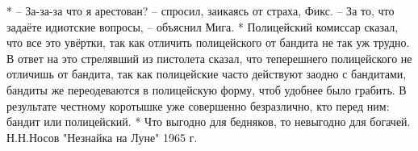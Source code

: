 *
– За-за-за что я арестован? – спросил, заикаясь от страха, Фикс. – За то, что задаёте идиотские вопросы, – объяснил Мига. 
*
Полицейский комиссар сказал, что все это увёртки, так как отличить полицейского от бандита не так уж трудно. В ответ на это стрелявший из пистолета сказал, что теперешнего полицейского не отличишь от бандита, так как полицейские часто действуют заодно с бандитами, бандиты же переодеваются в полицейскую форму, чтоб удобнее было грабить. В результате честному коротышке уже совершенно безразлично, кто перед ним: бандит или полицейский. 
*
Что выгодно для бедняков, то невыгодно для богачей. 
Н.Н.Носов
"Незнайка на Луне"
1965 г.

